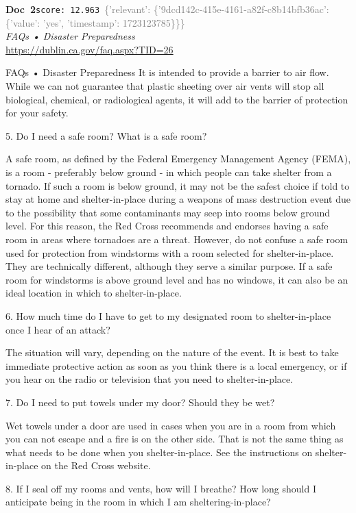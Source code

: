 \documentclass[a4paper,11pt]{article}
\begin{document}
\begin{docenv}
{\footnotesize\textcolor{doccolor}{\textbf{Doc~2}}}\hfill{\tiny\texttt{score:~12.963}}\ {\tiny\textcolor{gray}{\{'relevant': \{'9dcd142c-415e-4161-a82f-c8b14bfb36ac': \{'value': 'yes', 'timestamp': 1723123785\}\}\}}}\\[3pt]
{\small\textit{FAQs • Disaster Preparedness}}\\[2pt]
{\tiny\url{https://dublin.ca.gov/faq.aspx?TID=26}}\\[4pt]
{\footnotesize FAQs • Disaster Preparedness
It is intended to provide a barrier to air flow. While we can not guarantee that plastic sheeting over air vents will stop all biological, chemical, or radiological agents, it will add to the barrier of protection for your safety.	

5.
Do I need a safe room? What is a safe room?

A safe room, as defined by the Federal Emergency Management Agency (FEMA), is a room - preferably below ground - in which people can take shelter from a tornado. If such a room is below ground, it may not be the safest choice if told to stay at home and shelter-in-place during a weapons of mass destruction event due to the possibility that some contaminants may seep into rooms below ground level. For this reason, the Red Cross recommends and endorses having a safe room in areas where tornadoes are a threat. However, do not confuse a safe room used for protection from windstorms with a room selected for shelter-in-place. They are technically different, although they serve a similar purpose. If a safe room for windstorms is above ground level and has no windows, it can also be an ideal location in which to shelter-in-place.	

6.
How much time do I have to get to my designated room to shelter-in-place once I hear of an attack?

The situation will vary, depending on the nature of the event. It is best to take immediate protective action as soon as you think there is a local emergency, or if you hear on the radio or television that you need to shelter-in-place.	

7.
Do I need to put towels under my door? Should they be wet?

Wet towels under a door are used in cases when you are in a room from which you can not escape and a fire is on the other side. That is not the same thing as what needs to be done when you shelter-in-place. See the instructions on shelter-in-place on the Red Cross website.	

8.
If I seal off my rooms and vents, how will I breathe? How long should I anticipate being in the room in which I am sheltering-in-place?}
\end{docenv}
\end{document}
